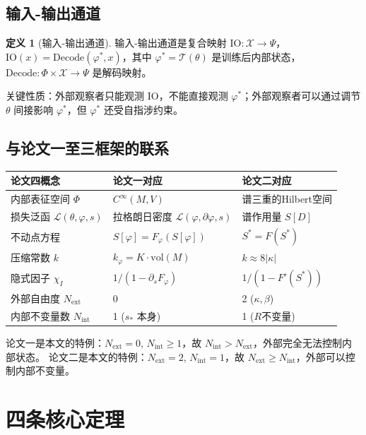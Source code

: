 \documentclass[12pt,a4paper]{article}
\theoremstyle{definition}
\newtheorem{definition}[theorem]{定义}
\newcommand{\mL}{\mathcal{L}}
\newcommand{\mT}{\mathcal{T}}
\newcommand{\mX}{\mathcal{X}}
\newcommand{\mPhi}{\Phi}
\newcommand{\mPsi}{\Psi}
\newcommand{\vol}{\mathrm{vol}}
\newcommand{\chiI}{\chi_I}
\newcommand{\Nint}{N_{\mathrm{int}}}
\newcommand{\Next}{N_{\mathrm{ext}}}
\begin{document}
\subsection{输入-输出通道}

\begin{definition}[输入-输出通道]
\label{def:io}
输入-输出通道是复合映射 $\mathrm{IO}: \mX \to \mPsi$，$\mathrm{IO}(x) = \mathrm{Decode}(\varphi^*, x)$，其中 $\varphi^* = \mT(\theta)$ 是训练后内部状态，$\mathrm{Decode}: \mPhi \times \mX \to \mPsi$ 是解码映射。
\end{definition}

关键性质：外部观察者只能观测 $\mathrm{IO}$，不能直接观测 $\varphi^*$；外部观察者可以通过调节 $\theta$ 间接影响 $\varphi^*$，但 $\varphi^*$ 还受自指涉约束。

\subsection{与论文一至三框架的联系}

\begin{longtable}{p{} p{} p{}}
\toprule
论文四概念 & 论文一对应 & 论文二对应 \\
\midrule
内部表征空间 $\mPhi$ & $C^\infty(M, V)$ & 谱三重的Hilbert空间 \\
损失泛函 $\mL(\theta, \varphi, s)$ & 拉格朗日密度 $\mL(\varphi, \partial\varphi, s)$ & 谱作用量 $S[D]$ \\
不动点方程 & $S[\varphi] = F_\varphi(S[\varphi])$ & $S^* = F(S^*)$ \\
压缩常数 $k$ & $k_\varphi = K \cdot \vol(M)$ & $k \approx 8|\kappa|$ \\
隐式因子 $\chiI$ & $1/(1 - \partial_s F_\varphi)$ & $1/(1 - F'(S^*))$ \\
外部自由度 $\Next$ & 0 & 2 ($\kappa, \beta$) \\
内部不变量数 $\Nint$ & 1 ($s_*$ 本身) & 1 ($R$不变量) \\
\bottomrule
\end{longtable}

论文一是本文的特例：$\Next = 0$, $\Nint \geq 1$，故 $\Nint > \Next$，外部完全无法控制内部状态。
论文二是本文的特例：$\Next = 2$, $\Nint = 1$，故 $\Next \geq \Nint$，外部可以控制内部不变量。

\section{四条核心定理}
\label{sec:theorems}
\end{document}
